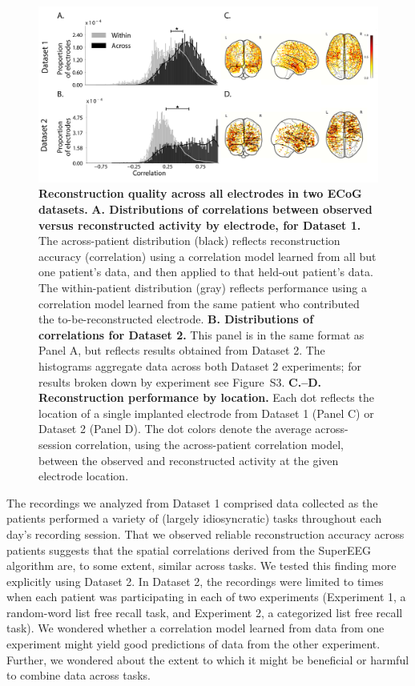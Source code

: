 \documentclass[11pt]{article}
\newcommand{\perexptaskreconseparated}{S3}
\begin{document}
\begin{figure}
  \centering
  \includegraphics[width=\textwidth]{figs/corrmap}
  \caption{\textbf{Reconstruction quality across all electrodes in two
      ECoG datasets.}  \textbf{A. Distributions of correlations
      between observed versus reconstructed activity by electrode, for
      Dataset 1.}  The across-patient distribution (black) reflects
    reconstruction accuracy (correlation) using a correlation model
    learned from all but one patient's data, and then applied to that
    held-out patient's data.  The within-patient distribution (gray)
    reflects performance using a correlation model learned from the same
    patient who contributed the to-be-reconstructed electrode.
    \textbf{B. Distributions of correlations for Dataset 2.}  This
    panel is in the same format as Panel A, but reflects results
    obtained from Dataset 2.  The histograms aggregate data across
    both Dataset 2 experiments; for results broken down by experiment
    see Figure~\perexptaskreconseparated. \textbf{C.--D.  Reconstruction
      performance by location.} Each dot reflects the location of a
    single implanted electrode from Dataset 1 (Panel C) or Dataset 2
    (Panel D).  The dot colors denote the average across-session
    correlation, using the across-patient correlation model, between
    the observed and reconstructed activity at the given electrode
    location.}
  \label{fig:corrmap}
\end{figure}

The recordings we analyzed from Dataset 1 comprised data collected as
the patients performed a variety of (largely idiosyncratic) tasks
throughout each day's recording session.  That we observed reliable
reconstruction accuracy across patients suggests that the spatial
correlations derived from the SuperEEG algorithm are, to some extent,
similar across tasks.  We tested this finding more explicitly using
Dataset 2.  In Dataset 2, the recordings were limited to times when
each patient was participating in each of two experiments (Experiment
1, a random-word list free recall task, and Experiment 2, a
categorized list free recall task).  We wondered whether a correlation
model learned from data from one experiment might yield good
predictions of data from the other experiment.  Further, we wondered
about the extent to which it might be beneficial or harmful to combine
data across tasks.
\end{document}
